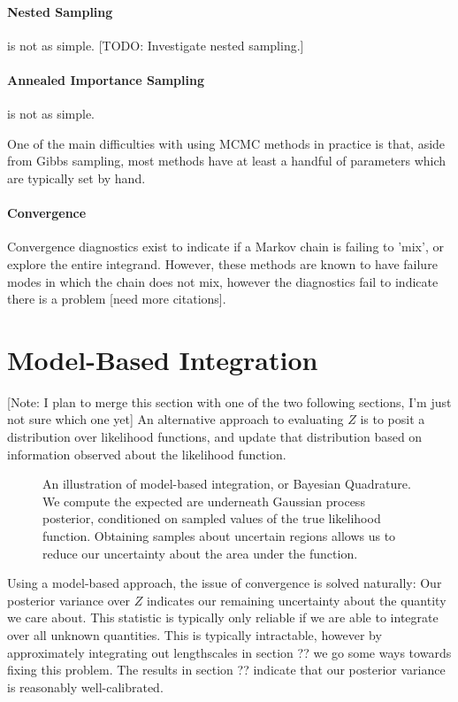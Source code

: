 \documentclass{article}
\begin{document}
\paragraph*{Nested Sampling} is not as simple. [TODO: Investigate nested sampling.] \cite{skilling2004nested}

\paragraph*{Annealed Importance Sampling} is not as simple.

\citep{neal2001annealed}

One of the main difficulties with using MCMC methods in practice is that, aside from Gibbs sampling, most methods have at least a handful of parameters which are typically set by hand.

\paragraph{Convergence}
Convergence diagnostics exist to indicate if a Markov chain is failing to 'mix', or explore the entire integrand.  However, these methods are known to have failure modes in which the chain does not mix, however the diagnostics fail to indicate there is a problem \citep{NealMC} [need more citations].

\section{Model-Based Integration}

[Note: I plan to merge this section with one of the two following sections, I'm just not sure which one yet] An alternative approach to evaluating $Z$ is to posit a distribution over likelihood functions, and update that distribution based on information observed about the likelihood function.

\begin{figure}
\centering
\caption{An illustration of model-based integration, or Bayesian Quadrature.  We compute the expected are underneath Gaussian process posterior, conditioned on sampled values of the true likelihood function.  Obtaining samples about uncertain regions allows us to reduce our uncertainty about the area under the function.  }
\label{fig:model_based}
\end{figure}

Using a model-based approach, the issue of convergence is solved naturally:  Our posterior variance over $Z$ indicates our remaining uncertainty about the quantity we care about.  This statistic is typically only reliable if we are able to integrate over all unknown quantities.  This is typically intractable, however by approximately integrating out lengthscales in section ?? we go some ways towards fixing this problem.  The results in section ?? indicate that our posterior variance is reasonably well-calibrated.
\end{document}

